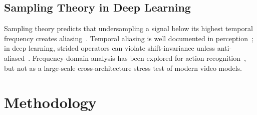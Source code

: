 \documentclass[a4paper, 10pt, conference]{ieeeconf}
\begin{document}
\subsection{Sampling Theory in Deep Learning}

Sampling theory predicts that undersampling a signal below its highest temporal frequency creates aliasing~\cite{shannon1949communication}. Temporal aliasing is well documented in perception~\cite{vanrullen2007wagon}; in deep learning, strided operators can violate shift-invariance unless anti-aliased~\cite{zhang2019antialiased}. Frequency-domain analysis has been explored for action recognition~\cite{tran2014frequency}, but not as a large-scale cross-architecture stress test of modern video models.

\section{Methodology}
\label{sec:method}
\end{document}
